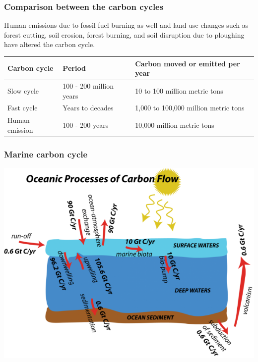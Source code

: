 \documentclass[11pt]{article}
\begin{document}
\subsubsection{Comparison between the carbon cycles}
\label{sec:org8d2a543}
Human emissions due to fossil fuel burning as well and land-use changes such as forest cutting, soil erosion, forest burning, and soil disruption due to ploughing have altered the carbon cycle.
\begin{center}
\begin{tabular}{l|l|l}
\textbf{Carbon cycle} & \textbf{Period} & \textbf{Carbon moved or emitted per year}\\
\hline
Slow cycle & 100 - 200 million years & 10 to 100 million metric tons\\
Fast cycle & Years to decades & 1,000 to 100,000 million metric tons\\
Human emission & 100 - 200 years & 10,000 million metric tons\\
\end{tabular}
\end{center}
\subsubsection{Marine carbon cycle}
\label{sec:orgdf2b169}
\begin{center}
\includegraphics[width=.9\linewidth]{./images/marine-carbon-cycle.png}
\end{center}

\newpage
\end{document}
